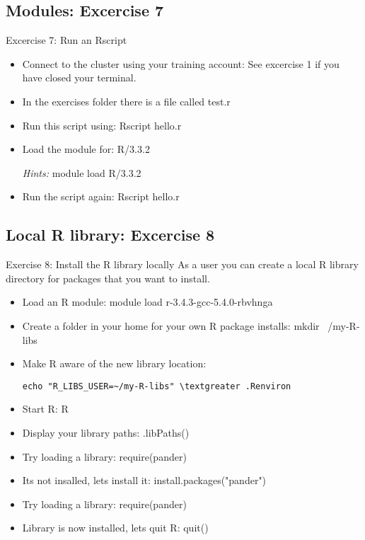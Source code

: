 \subsection{Modules: Excercise 7}
\begin{frame}[fragile]{Excercise 7: Run an Rscript}
\begin{itemize}
\item{Connect to the cluster using your training account: See excercise 1 if you have closed your terminal.}
\item{In the exercises folder there is a file called test.r}
\item{Run this script using: Rscript hello.r }
\item{Load the module for: R/3.3.2}
\item[\emph{Hints:}]{\alert{module load R/3.3.2}}
\item{Run the script again: Rscript hello.r}
\end{itemize}
\end{frame}

\subsection{Local R library: Excercise 8}
\begin{frame}[fragile]{Exercise 8: Install the R library locally}
As a user you can create a local R library directory for packages that you want to install. 

\begin{itemize}
\item Load an R module: 
module load r-3.4.3-gcc-5.4.0-rbvhnga
\item Create a folder in your home for your own R package installs:
mkdir ~/my-R-libs
\item Make R aware of the new library location:
\begin{verbatim}
echo "R_LIBS_USER=~/my-R-libs" \textgreater .Renviron
\end{verbatim}
\item Start R:
R
\item Display your library paths:
.libPaths()
\item Try loading a library:
require(pander)
\item Its not insalled, lets install it:
install.packages("pander")
\item Try loading a library:
require(pander)
\item Library is now installed, lets quit R:
quit()
\end{itemize}
\end{frame}

